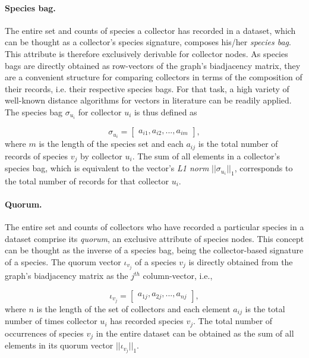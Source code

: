 {\paragraph{Species bag.} 
The entire set and counts of species a collector has recorded in a dataset, which can be thought as a collector's species signature, composes his/her \textit{species bag}. This attribute is therefore exclusively derivable for collector nodes.
As species bags are directly obtained as row-vectors of the graph's biadjacency matrix, they are a convenient structure for comparing collectors in terms of the composition of their records, i.e. their respective species bags.
For that task, a high variety of well-known distance algorithms for vectors in literature can be readily applied.
The species bag $\sigma_{u_i}$ for collector $u_i$ is thus defined as

$$
\sigma_{u_i} =  \begin{bmatrix}
a_{i 1}, a_{i 2}, ..., a_{i m}
\end{bmatrix},
$$
where $m$ is the length of the species set and each $a_{i j}$ is the total number of records of species $v_j$ by collector $u_i$. The sum of all elements in a collector's species bag, which is equivalent to the vector's \textit{L1 norm} $||\sigma_{u_i}||_1$, corresponds to the total number of records for that collector $u_i$.

 
\paragraph{Quorum.} 
The entire set and counts of collectors who have recorded a particular species in a dataset comprise its \textit{quorum}, an exclusive attribute of species nodes. 
This concept can be thought as the inverse of a species bag, being the collector-based signature of a species. 
The quorum vector $\iota_{v_j}$ of a species $v_j$ is directly obtained from the graph's biadjacency matrix as the $j^{th}$ column-vector, i.e.,

$$
\iota_{v_j} = \begin{bmatrix}
a_{1 j}, a_{2 j}, ..., a_{n j}
\end{bmatrix},
$$
where $n$ is the length of the set of collectors and each element $a_{i j}$ is the total number of times collector $u_i$ has recorded species $v_j$. 
The total number of occurrences of species $v_j$ in the entire dataset can be obtained as the sum of all elements in its quorum vector $ || \iota_{v_j} ||_1$.

}
